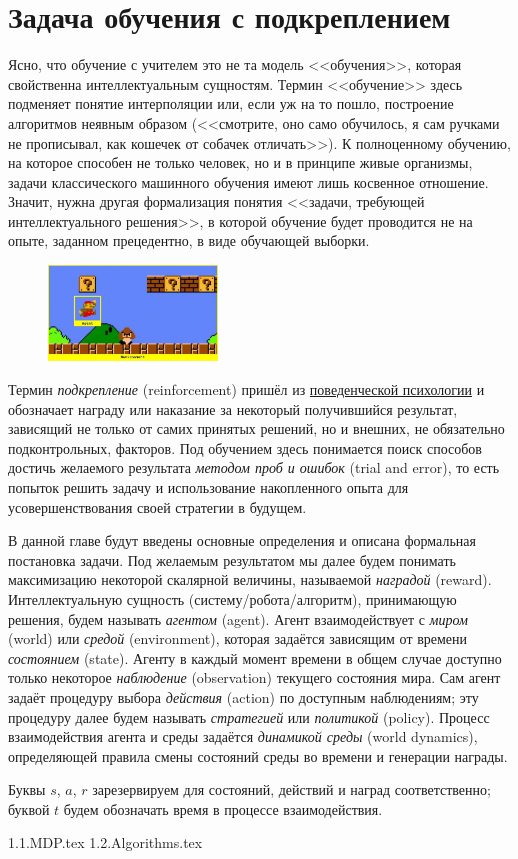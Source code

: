 \documentclass[../main.tex]{subfiles}
\begin{document}
\chapter{Задача обучения с подкреплением}

Ясно, что обучение с учителем это не та модель <<обучения>>, которая свойственна интеллектуальным сущностям. Термин <<обучение>> здесь подменяет понятие интерполяции или, если уж на то пошло, построение алгоритмов неявным образом (<<смотрите, оно само обучилось, я сам ручками не прописывал, как кошечек от собачек отличать>>). К полноценному обучению, на которое способен не только человек, но и в принципе живые организмы, задачи классического машинного обучения имеют лишь косвенное отношение. Значит, нужна другая формализация понятия <<задачи, требующей интеллектуального решения>>, в которой обучение будет проводится не на опыте, заданном прецедентно, в виде обучающей выборки.

\begin{figure}
\centering
\includegraphics[width=0.4\textwidth]{Images/agentenv.png}
\end{figure}

Термин \emph{подкрепление} (reinforcement) пришёл из \href{https://ru.wikipedia.org/wiki/\%D0\%91\%D0\%B8\%D1\%85\%D0\%B5\%D0\%B2\%D0\%B8\%D0\%BE\%D1\%80\%D0\%B8\%D0\%B7\%D0\%BC}{поведенческой психологии} и обозначает награду или наказание за некоторый получившийся результат, зависящий не только от самих принятых решений, но и внешних, не обязательно подконтрольных, факторов. Под обучением здесь понимается поиск способов достичь желаемого результата \emph{методом проб и ошибок} (trial and error), то есть попыток решить задачу и использование накопленного опыта для усовершенствования своей стратегии в будущем.

В данной главе будут введены основные определения и описана формальная постановка задачи. Под желаемым результатом мы далее будем понимать максимизацию некоторой скалярной величины, называемой \emph{наградой} (reward). Интеллектуальную сущность (систему/робота/алгоритм), принимающую решения, будем называть \emph{агентом} (agent). Агент взаимодействует с \emph{миром} (world) или \emph{средой} (environment), которая задаётся зависящим от времени \emph{состоянием} (state). Агенту в каждый момент времени в общем случае доступно только некоторое \emph{наблюдение} (observation) текущего состояния мира. Сам агент задаёт процедуру выбора \emph{действия} (action) по доступным наблюдениям; эту процедуру далее будем называть \emph{стратегией} или \emph{политикой} (policy). Процесс взаимодействия агента и среды задаётся \emph{динамикой среды} (world dynamics), определяющей правила смены состояний среды во времени и генерации награды.

Буквы $s$, $a$, $r$ зарезервируем для состояний, действий и наград соответственно; буквой $t$ будем обозначать время в процессе взаимодействия. 

{1.1.MDP.tex}
{1.2.Algorithms.tex}
\end{document}

